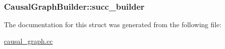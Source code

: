 \hypertarget{structCausalGraphBuilder_a9a722f3782f6737608fd4b5fc8d9ea4e}{
\subsubsection[{succ\-\_\-builder}]{ Causal\-Graph\-Builder\-::succ\-\_\-builder}}\label{structCausalGraphBuilder_a9a722f3782f6737608fd4b5fc8d9ea4e}


The documentation for this struct was generated from the following file\-:\begin{DoxyCompactItemize}
\item 
\hyperlink{causal__graph_8cc}{causal\-\_\-graph.\-cc}\end{DoxyCompactItemize}
